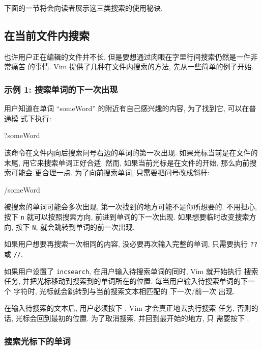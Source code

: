 下面的一节将会向读者展示这三类搜索的使用秘诀.

\subsection{在当前文件内搜索}
\label{subsec:search_the_current_file}

也许用户正在编辑的文件并不长, 但是要想通过肉眼在字里行间搜索仍然是一件非常痛苦
的事情. Vim 提供了几种在文件内搜索的方法, 先从一些简单的例子开始.

\subsubsection{示例 1: 搜索单词的下一次出现}
\label{subsubsec:example_1_find_the_next_occurrence_of_a_word}

用户知道在单词 ``someWord'' 的附近有自己感兴趣的内容, 为了找到它, 可以在普通模
式下执行:
\begin{vimcode}
?someWord
\end{vimcode}
该命令在文件内向后搜索问号右边的单词的第一次出现. 如果光标当前是在文件的末尾,
用它来搜索单词正好合适. 然而, 如果当前光标是在文件的开始, 那么向前搜索可能会
更合理一点. 为了向前搜索单词, 只需要把问号改成斜杆:
\begin{vimcode}
/someWord
\end{vimcode}
被搜索的单词可能会多次出现, 第一次找到的地方可能不是你所想要的. 不用担心, 按下
\texttt{n} 就可以按照搜索方向, 前进到单词的下一次出现. 如果想要临时改变搜索方向,
按下 \texttt{N}, 就会跳转到单词的前一次出现.

如果用户想要再搜索一次相同的内容, 没必要再次输入完整的单词, 只需要执行
\texttt{??} 或 \texttt{//}.

如果用户设置了 \texttt{incsearch}, 在用户输入待搜索单词的同时, Vim 就开始执行
搜索任务, 并把光标移动到搜索到的单词所在的位置. 每当用户输入待搜索单词的下一个
字符时, 光标就会跳转到与当前搜索文本相匹配的 下一次/前一次 出现.

\begin{warning}
    在输入待搜索的文本后, 用户必须按下 , Vim 才会真正地去执行搜索
    任务, 否则的话, 光标会回到最初的位置. 为了取消搜索, 并回到最开始的地方, 只
    需要按下 .
\end{warning}

\subsubsection{搜索光标下的单词}
\label{subsubsec:search_for_a_word_under_the_cursor}

